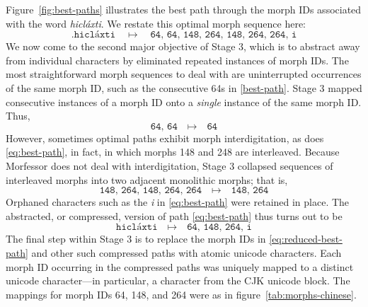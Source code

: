 Figure~\ref{fig:best-paths} illustrates the 
 best path through the morph IDs associated with the word \textit{hicl\'{a}xti}.
 We restate this optimal morph sequence here:
\begin{equation}\label{eq:best-path}. 
\texttt{hicl\'{a}xti} \quad \mapsto \quad \texttt{64, 64, 148, 264, 148, 264, 264, i}
\end{equation}
We now come to the second major objective of Stage 3, which is to abstract away from individual characters by eliminated repeated instances of morph IDs. 
The most straightforward morph sequences to deal with are uninterrupted occurrences of the same morph ID, such as the consecutive 64s in \eqref{best-path}. Stage 3 mapped consecutive instances of a morph ID onto a \emph{single} instance of the same morph ID. Thus,  
\begin{equation*}
\texttt{64, 64} \quad \mapsto \quad \texttt{64}
\end{equation*}
However, sometimes optimal paths
exhibit morph interdigitation, as does \eqref{eq:best-path}, in fact, in which morphs 148 and 248 are interleaved. 
Because Morfessor does not deal 
with interdigitation, Stage 3 collapsed sequences of interleaved morphs into two adjacent monolithic
morphs; that is, 
\begin{equation*}
\texttt{148, 264, 148, 264, 264} \quad \mapsto \quad \texttt{148, 264}
\end{equation*}
Orphaned characters such as the \textit{i} in \eqref{eq:best-path} 
were retained in place. The abstracted, or compressed, version of path \eqref{eq:best-path} thus turns out to be
\begin{equation}\label{eq:reduced-best-path}
\texttt{hicl\'{a}xti} \quad \mapsto \quad \texttt{64, 148, 264, i}
\end{equation}
The final step within Stage 3 is to replace the morph IDs in \eqref{eq:reduced-best-path} and other such compressed paths with atomic unicode characters. Each morph ID occurring in the compressed paths was uniquely mapped to a distinct unicode character---in particular, a character 
from the CJK unicode block. The mappings for morph IDs 64, 148, and 264 
were as in figure~\ref{tab:morphs-chinese}.
